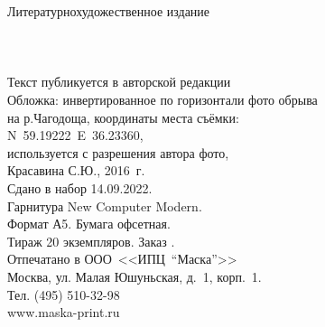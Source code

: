 {
\newpage
\thispagestyle{empty}
\begin{center}
{\small Литературно\sdash художественное издание}\\
\vspace{1.6cm}
{\Large \MyVarAuthorName}\\
\vspace{1.6cm}
{\Large\textbf\MyVarBookName}\\
\vspace{0.4cm}
{\Large\textbf\MyVarBookNamesec}\\
\vspace{1.0cm}
{\small%
Текст публикуется в авторской редакции\\
\vspace{1.0cm}
Обложка: инвертированное по горизонтали фото обрыва\\
на р.Чагодоща, координаты места съёмки:\\N~59.19222\degree~E~36.23360\degree,\\используется с разрешения автора фото,\\ Красавина С.Ю., 2016~г.\\
\vspace{1.5cm}
Сдано в набор 14.09.2022.\\
Гарнитура New Computer Modern.\\
Формат А5. Бумага офсетная.\\
Тираж 20 экземпляров. Заказ .\\
\vspace{1.0cm}
Отпечатано в ООО~<<ИПЦ~"`Маска"'>>\\
Москва, ул. Малая Юшуньская, д.~1, корп.~1.\\
Тел. (495) 510-32-98\\
www.maska-print.ru
}
\end{center}
}